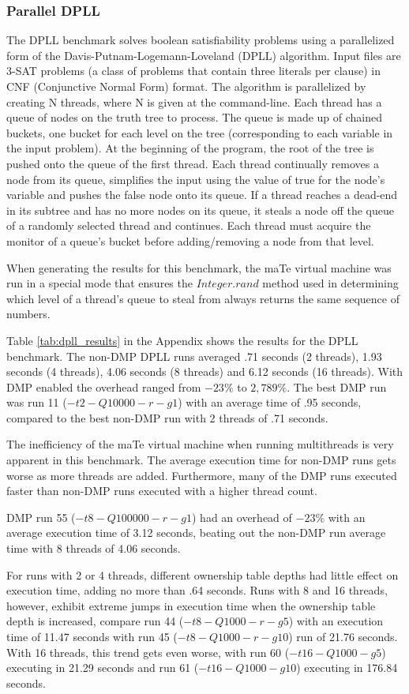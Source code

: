 \subsubsection{Parallel DPLL}

The DPLL benchmark solves boolean satisfiability problems using a
parallelized form of the Davis-Putnam-Logemann-Loveland (DPLL)
algorithm.  Input files are 3-SAT problems (a class of problems that
contain three literals per clause) in CNF (Conjunctive Normal Form)
format.  The algorithm is parallelized by creating N threads, where N
is given at the command-line.  Each thread has a queue of nodes on the
truth tree to process.  The queue is made up of chained buckets, one
bucket for each level on the tree (corresponding to each variable in
the input problem).  At the beginning of the program, the root of the
tree is pushed onto the queue of the first thread.  Each thread
continually removes a node from its queue, simplifies the input using
the value of true for the node's variable and pushes the false node
onto its queue.  If a thread reaches a dead-end in its subtree and has
no more nodes on its queue, it steals a node off the queue of a
randomly selected thread and continues.  Each thread must acquire the
monitor of a queue's bucket before adding/removing a node from that
level.

When generating the results for this benchmark, the maTe virtual
machine was run in a special mode that ensures the $Integer.rand$
method used in determining which level of a thread's queue to steal
from always returns the same sequence of numbers.

Table \ref{tab:dpll_results} in the Appendix shows the results for the
DPLL benchmark.  The non-DMP DPLL runs averaged .71 seconds (2
threads), 1.93 seconds (4 threads), 4.06 seconds (8 threads) and 6.12
seconds (16 threads).  With DMP enabled the overhead ranged from
$-23\%$ to $2,789\%$.  The best DMP run was run 11 ($-t2 -Q10000 -r
-g1$) with an average time of .95 seconds, compared to the best
non-DMP run with 2 threads of .71 seconds.

The inefficiency of the maTe virtual machine when running multithreads
is very apparent in this benchmark.  The average execution time for
non-DMP runs gets worse as more threads are added.  Furthermore, many
of the DMP runs executed faster than non-DMP runs executed with a
higher thread count.

DMP run 55 ($-t8 -Q100000 -r -g1$) had an overhead of $-23\%$ with an
average execution time of 3.12 seconds, beating out the non-DMP run
average time with 8 threads of 4.06 seconds.

For runs with 2 or 4 threads, different ownership table depths had
little effect on execution time, adding no more than .64 seconds.
Runs with 8 and 16 threads, however, exhibit extreme jumps in
execution time when the ownership table depth is increased, compare
run 44 ($-t8 -Q1000 -r -g5$) with an execution time of 11.47 seconds
with run 45 ($-t8 -Q1000 -r -g10$) run of 21.76 seconds.  With 16
threads, this trend gets even worse, with run 60 ($-t16 -Q1000 -g5$)
executing in 21.29 seconds and run 61 ($-t16 -Q1000 -g10$) executing
in 176.84 seconds.

